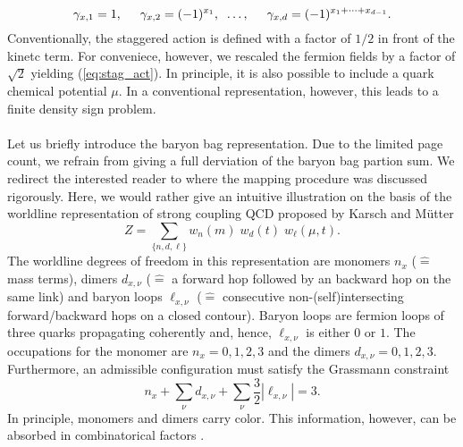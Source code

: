 \documentclass{PoS}
\begin{document}
\begin{equation}
\gamma_{x, 1} = 1, \hspace*{0.5cm}\gamma_{x, 2} = (-1)^{x_1},\;\; \dots, \hspace*{0.5cm}\gamma_{x, d} = (-1)^{x_1 + \dots + x_{d-1}}.
\end{equation}
Conventionally, the staggered action is defined with a factor of $1/2$ in front of the kinetc term. For conveniece, however, we rescaled the fermion fields by a factor of $\sqrt{2}$ yielding (\ref{eq:stag_act}). In principle, it is also possible to include a quark chemical potential $\mu$. In a conventional representation, however, this leads to a finite density sign problem.\\
\\
Let us briefly introduce the baryon bag representation. Due to the limited page count, we refrain from giving a full derviation of the baryon bag partion sum. We redirect the interested reader to \cite{Gattringer:2018mrg} where the mapping procedure was discussed rigorously. Here, we would rather give an intuitive illustration on the basis of the worldline representation of strong coupling QCD proposed by Karsch and M\"utter \cite{Karsch:1988zx}
\begin{equation}
Z = \sum_{\{n, d, \ell\}} w_n(m) \; w_d(t) \; w_{\ell}(\mu,t).
\end{equation}
The worldline degrees of freedom in this representation are monomers $n_x$ ($\hat{=}$ mass terms), dimers $d_{x,\nu}$ ($\hat{=}$ a forward hop followed by an backward hop on the same link) and baryon loops $\ell_{x,\nu}$ ($\hat{=}$ consecutive non-(self)intersecting forward/backward hops on a closed contour). Baryon loops are fermion loops of three quarks propagating coherently and, hence, $\ell_{x,\nu}$ is either $0$ or $1$. The occupations for the monomer are $n_x = 0,1,2,3$ and the dimers $d_{x,\nu} = 0,1,2,3$. Furthermore, an admissible configuration must satisfy the Grassmann constraint
\begin{equation}
n_x + \sum_{\nu} d_{x,\nu} + \sum_{\nu} \frac{3}{2} |\ell_{x,\nu}| = 3.
\label{eq:GM_const}
\end{equation}
In principle, monomers and dimers carry color. This information, however, can be absorbed in combinatorical factors \cite{Rossi:1984cv, Karsch:1988zx, Marchis:2018tcs}.\\
\\
\end{document}
